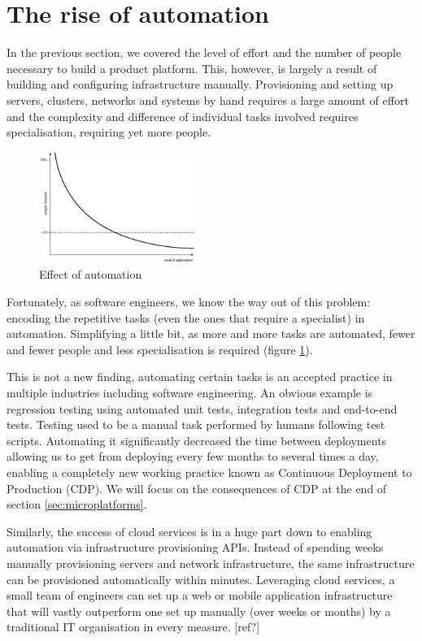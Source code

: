 \documentclass[reprint,amsmath,amssymb,aps]{revtex4-1}
\begin{document}
\section{The rise of automation}
\label{sec:automation}

In the previous section, we covered the level of effort and the number of people necessary to build a product platform. This, however, is largely a result of building and configuring infrastructure manually. Provisioning and setting up servers, clusters, networks and systems by hand requires a large amount of effort and the complexity and difference of individual tasks involved requires specialisation, requiring yet more people.

\begin{figure}[h]
	\includegraphics[width=0.45\textwidth]{figs/automation}
	\caption{Effect of automation}
	\label{fig:automationn}
\end{figure}

Fortunately, as software engineers, we know the way out of this problem: encoding the repetitive tasks (even the ones that require a specialist) in automation. Simplifying a little bit, as more and more tasks are automated, fewer and fewer people and less specialisation is required (figure \ref{fig:automationn}).

This is not a new finding, automating certain tasks is an accepted practice in multiple industries including software engineering. An obvious example is regression testing using automated unit tests, integration tests and end-to-end tests. Testing used to be a manual task performed by humans following test scripts. Automating it significantly decreased the time between deployments allowing us to get from deploying every few months to several times a day, enabling a completely new working practice known as Continuous Deployment to Production (CDP). We will focus on the consequences of CDP at the end of section \ref{sec:microplatforms}.

Similarly, the success of cloud services is in a huge part down to enabling automation via infrastructure provisioning APIs. Instead of spending weeks manually provisioning servers and network infrastructure, the same infrastructure can be provisioned automatically within minutes. Leveraging cloud services, a small team of engineers can set up a web or mobile application infrastructure that will vastly outperform one set up manually (over weeks or months) by a traditional IT organisation in every measure. [ref?]
\end{document}
